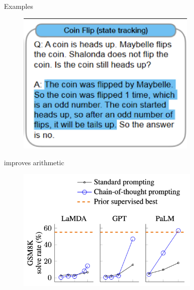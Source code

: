 \begin{vbframe}{Examples}

\vfill

\begin{figure}
    \centering
    \includegraphics[height=7cm]{figure/cotex6.png}
\end{figure}

\vfill

\end{vbframe}


\begin{vbframe}{\cotp improves arithmetic}

\vfill
	
	\begin{figure}
		\centering
		\includegraphics[height = 6cm]{figure/cotperformance} 
	\end{figure}

\vfill

\end{vbframe}



